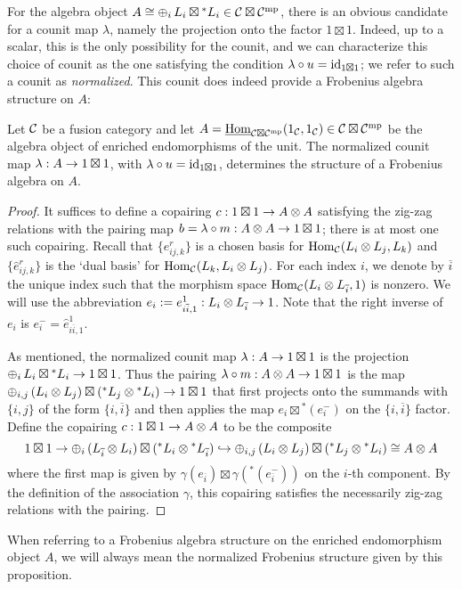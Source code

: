 \documentclass{amsart}
\begin{document}
For the algebra object $A \cong \oplus_i \, L_i \boxtimes {}^* L_i \in \mathcal C \boxtimes \mathcal C^{\mathrm{mp}}$, there is an obvious candidate for a counit map $\lambda$, namely the projection onto the factor $1 \boxtimes 1$.  Indeed, up to a scalar, this is the only possibility for the counit, and we can characterize this choice of counit as the one satisfying the condition $\lambda \circ u = \mathrm{id}_{1 \boxtimes 1}$; we refer to such a counit as \emph{normalized}.  This counit does indeed provide a Frobenius algebra structure on $A$:
\begin{proposition}
Let $\mathcal C$ be a fusion category and let $A = \operatorname{\underline{Hom}}_{\mathcal C \boxtimes \mathcal C^{\mathrm{mp}}}(1_\mathcal C,1_\mathcal C) \in \mathcal C \boxtimes \mathcal C^{\mathrm{mp}}$ be the algebra object of enriched endomorphisms of the unit.  The normalized counit map $\lambda: A \rightarrow 1 \boxtimes 1$, with $\lambda \circ u = \mathrm{id}_{1 \boxtimes 1}$, determines the structure of a Frobenius algebra on $A$.
\end{proposition}
\begin{proof}
It suffices to define a copairing $c : 1 \boxtimes 1 \rightarrow A \otimes A$ satisfying the zig-zag relations with the pairing map $b = \lambda \circ m : A \otimes A \rightarrow 1 \boxtimes 1$; there is at most one such copairing.  Recall that $\{e^r_{ij,k}\}$ is a chosen basis for $\operatorname{Hom}_\mathcal C(L_i \otimes L_j,L_k)$ and $\{\hat{e}^r_{ij,k}\}$ is the `dual basis' for $\operatorname{Hom}_\mathcal C(L_k,L_i \otimes L_j)$.  For each index $i$, we denote by $\overline{i}$ the unique index such that the morphism space $\operatorname{Hom}_\mathcal C(L_i \otimes L_{\overline{i}},1)$ is nonzero.  We will use the abbreviation $e_i := e^1_{i\overline{i},1} : L_i \otimes L_{\overline{i}} \rightarrow 1$.  Note that the right inverse of $e_i$ is $e_i^{-} = \hat{e}^1_{i\overline{i},1}$.

As mentioned, the normalized counit map $\lambda: A \rightarrow 1 \boxtimes 1$ is the projection $\oplus_i \, L_i \boxtimes {}^* L_i \rightarrow 1 \boxtimes 1$.  Thus the pairing $\lambda \circ m: A \otimes A \rightarrow 1 \boxtimes 1$ is the map $\oplus_{i,j} \, (L_i \otimes L_j) \boxtimes ({}^* L_j \otimes {}^* L_i) \rightarrow 1 \boxtimes 1$ that first projects onto the summands with $\{i,j\}$ of the form $\{i,\overline{i}\}$ and then applies the map $e_i \boxtimes {}^* (e_i^{-})$ on the $\{i,\overline{i}\}$ factor.  Define the copairing $c : 1 \boxtimes 1 \rightarrow A \otimes A$ to be the composite
\[
1 \boxtimes 1 \rightarrow \oplus_i \, (L_{\overline{i}} \otimes L_i) \boxtimes ({}^* L_i \otimes {}^* L_{\overline{i}}) \hookrightarrow \oplus_{i,j}  \, (L_i \otimes L_j) \boxtimes ({}^* L_j \otimes {}^* L_i) \cong A \otimes A
\]
where the first map is given by $\gamma(e_{\overline{i}}) \boxtimes \gamma({}^*(e_{\overline{i}}^{-}))$ on the $i$-th component.  By the definition of the association $\gamma$, this copairing satisfies the necessarily zig-zag relations with the pairing.
\end{proof}
\nid When referring to a Frobenius algebra structure on the enriched endomorphism object $A$, we will always mean the normalized Frobenius structure given by this proposition.
\end{document}
